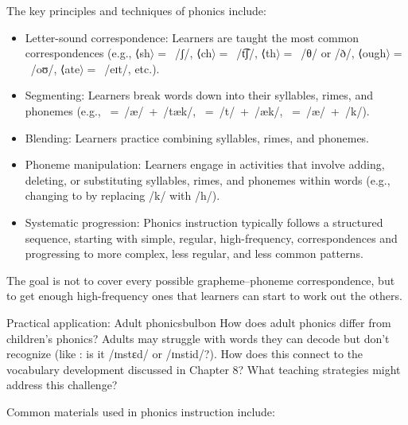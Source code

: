 The key principles and techniques of phonics include:

\begin{itemize}[noitemsep]
    \item Letter-sound correspondence: Learners are taught the most common correspondences (e.g., ⟨sh$\rangle=$~/ʃ/, ⟨ch$\rangle=$~/t͡ʃ/, ⟨th$\rangle=$~/θ/ or /ð/, ⟨ough$\rangle=$~/oʊ/, ⟨ate$\rangle=$~/eɪt/, etc.).
    \item Segmenting: Learners break words down into their syllables, rimes, and phonemes (e.g., ~=~/æ/~+~/tæk/, ~=~/t/~+~/æk/, ~=~/æ/~+~/k/).
    \item Blending: Learners practice combining syllables, rimes, and phonemes.
    \item Phoneme manipulation: Learners engage in activities that involve adding, deleting, or substituting syllables, rimes, and phonemes within words (e.g., changing  to  by replacing /k/ with /h/).
    \item Systematic progression: Phonics instruction typically follows a structured sequence, starting with simple, regular, high-frequency, correspondences and progressing to more complex, less regular, and less common patterns.
\end{itemize}

The goal is not to cover every possible grapheme--phoneme correspondence, but to get enough high-frequency ones that learners can start to work out the others.

\begin{tblsfilledsymbol}{Practical application: Adult phonics}{bulbon}
How does adult phonics differ from children's phonics? Adults may struggle with words they can decode but don't recognize (like : is it /ɪnstɛd/ or /ɪnstid/?). How does this connect to the vocabulary development discussed in Chapter 8? What teaching strategies might address this challenge?
\end{tblsfilledsymbol}

Common materials used in phonics instruction include:

